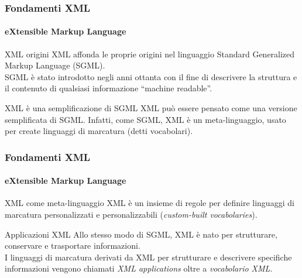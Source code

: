 


\begin{frame}
	\frametitle{Fondamenti XML}
	\framesubtitle{eXtensible Markup Language}
	\addtocounter{nframe}{1}

	\begin{block}{XML origini}
		XML affonda le proprie origini nel linguaggio Standard Generalized Markup Language (SGML).
		\\ SGML è stato introdotto negli anni ottanta con il fine di descrivere la struttura e il contenuto di qualsiasi informazione ``machine readable''.
	\end{block}

	\begin{block} {XML è una semplificazione di SGML}
		XML può essere pensato come una versione semplificata di SGML. Infatti, come SGML, XML è un meta-linguaggio, usato per create linguaggi di marcatura (detti vocabolari).
	\end{block}
\end{frame}

\begin{frame}
	\frametitle{Fondamenti XML}
	\framesubtitle{eXtensible Markup Language}
	\addtocounter{nframe}{1}

	\begin{block}{XML come meta-linguaggio}
		XML è un insieme di regole per definire linguaggi di marcatura personalizzati e personalizzabili (\textit{custom-built vocabolaries}).
	\end{block}

	\begin{block} {Applicazioni XML}
		Allo stesso modo di SGML, XML è nato per strutturare, conservare e trasportare informazioni.
		\\ I linguaggi di marcatura derivati da XML per strutturare e descrivere specifiche informazioni vengono chiamati \textit{XML applications} oltre a \textit{vocabolario XML}.
	\end{block}
\end{frame}


